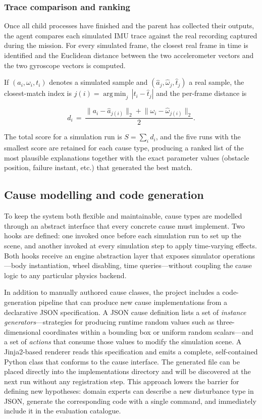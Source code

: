 \documentclass[a4paper, twoside]{article}
\DeclareMathOperator*{\argmin}{arg\,min}
\begin{document}
\subsubsection{Trace comparison and ranking}

Once all child processes have finished and the parent has collected their outputs, the agent compares each simulated IMU trace against the real recording captured during the mission.
For every simulated frame, the closest real frame in time is identified and the Euclidean distance between the two accelerometer vectors and the two gyroscope vectors is computed.

If $(a_i,\omega_i,t_i)$ denotes a simulated sample and $(\hat a_j,\hat\omega_j,\hat t_j)$ a real sample, the closest-match index is $j(i)=\argmin_j\,|t_i-\hat t_j|$ and the per-frame distance is

\begin{equation}
    d_i \,=\, \frac{\lVert a_i-\hat a_{j(i)}\rVert_2 + \lVert \omega_i-\hat\omega_{j(i)}\rVert_2}{2}.
\end{equation}

The total score for a simulation run is $S=\sum_i d_i$, and the five runs with the smallest score are retained for each cause type, producing a ranked list of the most plausible explanations together with the exact parameter values (obstacle position, failure instant, etc.) that generated the best match.

\subsection{Cause modelling and code generation}

To keep the system both flexible and maintainable, cause types are modelled through an abstract interface that every concrete cause must implement.
Two hooks are defined: one invoked once before each simulation run to set up the scene, and another invoked at every simulation step to apply time-varying effects.
Both hooks receive an engine abstraction layer that exposes simulator operations---body instantiation, wheel disabling, time queries---without coupling the cause logic to any particular physics backend.

In addition to manually authored cause classes, the project includes a code-generation pipeline that can produce new cause implementations from a declarative JSON specification.
A JSON cause definition lists a set of \emph{instance generators}---strategies for producing runtime random values such as three-dimensional coordinates within a bounding box or uniform random scalars---and a set of \emph{actions} that consume those values to modify the simulation scene.
A Jinja2-based renderer reads this specification and emits a complete, self-contained Python class that conforms to the cause interface.
The generated file can be placed directly into the implementations directory and will be discovered at the next run without any registration step.
This approach lowers the barrier for defining new hypotheses: domain experts can describe a new disturbance type in JSON, generate the corresponding code with a single command, and immediately include it in the evaluation catalogue.
\end{document}
